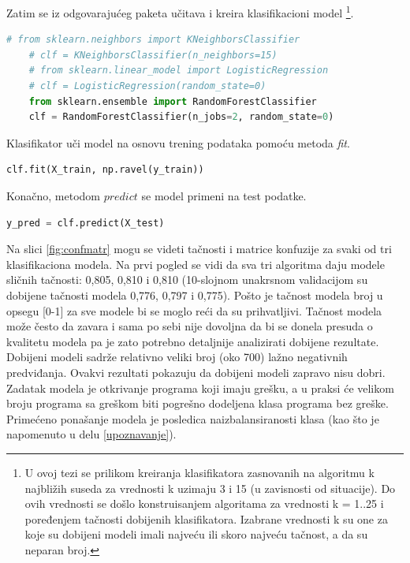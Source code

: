 \documentclass[12pt,oneside]{memoir}
\begin{document}
Zatim se iz odgovarajućeg paketa učitava i kreira klasifikacioni model \footnote{U ovoj tezi se prilikom kreiranja klasifikatora zasnovanih na algoritmu k najbližih suseda za vrednosti k uzimaju 3 i 15 (u zavisnosti od situacije). Do ovih vrednosti se došlo konstruisanjem algoritama za vrednosti k = 1..25 i poređenjem tačnosti dobijenih klasifikatora. Izabrane vrednosti k su one za koje su dobijeni modeli imali najveću ili skoro najveću tačnost, a da su neparan broj.}. 
\begin{lstlisting}[language=Python, basicstyle=\tiny]
	# from sklearn.neighbors import KNeighborsClassifier
	# clf = KNeighborsClassifier(n_neighbors=15)
	# from sklearn.linear_model import LogisticRegression
	# clf = LogisticRegression(random_state=0)
	from sklearn.ensemble import RandomForestClassifier
	clf = RandomForestClassifier(n_jobs=2, random_state=0)
\end{lstlisting}

Klasifikator uči model na osnovu trening podataka pomoću metoda \textit{fit}. 
\begin{lstlisting}[language=Python, basicstyle=\tiny]
	clf.fit(X_train, np.ravel(y_train))
\end{lstlisting}

Konačno, metodom $predict$ se model primeni na test podatke.
\begin{lstlisting}[language=Python, basicstyle=\tiny]
	y_pred = clf.predict(X_test)
\end{lstlisting}

Na slici \ref{fig:confmatr} mogu se videti tačnosti i matrice konfuzije za svaki od tri klasifikaciona modela. Na prvi pogled se vidi da sva tri algoritma daju modele sličnih tačnosti: 0,805, 0,810 i 0,810 (10-slojnom unakrsnom validacijom su dobijene tačnosti modela 0,776, 0,797 i 0,775). Pošto je tačnost modela broj u opsegu [0-1] za sve modele bi se moglo reći da su prihvatljivi. Tačnost modela može često da zavara i sama po sebi nije dovoljna da bi se donela presuda o kvalitetu modela pa je zato potrebno detaljnije analizirati dobijene rezultate. Dobijeni modeli sadrže relativno veliki broj (oko 700) lažno negativnih predviđanja. Ovakvi rezultati pokazuju da dobijeni modeli zapravo nisu dobri. Zadatak modela je otkrivanje programa koji imaju grešku, a u praksi će velikom broju programa sa greškom biti pogrešno dodeljena klasa programa bez greške. Primećeno ponašanje modela je posledica naizbalansiranosti klasa (kao što je napomenuto u delu \ref{upoznavanje}). 
\end{document}
